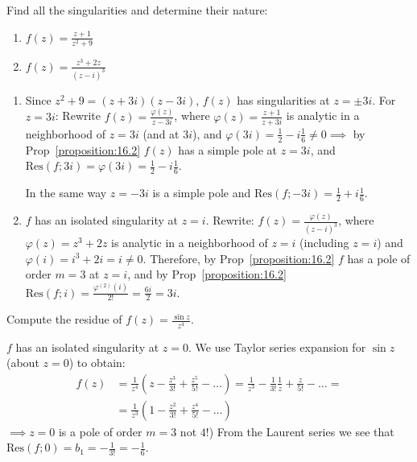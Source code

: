 \begin{example} \label{example:18.5} Find all the singularities and determine their nature:
    \begin{enumerate}
        \item $f(z) = \frac{z+1}{z^2 + 9}$
        \item $f(z) = \frac{z^3 + 2z}{(z-i)^3}$
    \end{enumerate}
\begin{soln}
    \begin{enumerate}
        \item Since $z^2 + 9 = (z+3i)(z-3i)$, $f(z)$ has singularities at $z = \pm 3i$. For $z = 3i$: Rewrite $f(z) = \frac{\varphi(z)}{z-3i}$, where $\varphi(z) = \frac{z+1}{z+3i}$ is analytic in a 
        neighborhood of $z = 3i$ (and at $3i$), 
        and $\varphi(3i) = \frac{1}{2} - i\frac{1}{6} \neq 0 \implies$ by Prop~\ref{proposition:16.2} $f(z)$ has a simple pole at $z = 3i$, and $\text{Res}(f; 3i) = \varphi(3i) = \frac{1}{2} - i\frac{1}{6}$.
    
    In the same way $z = -3i$ is a simple pole and $\text{Res}(f; -3i) = \frac{1}{2} + i\frac{1}{6}$.
    
    \item $f$ has an isolated singularity at $z = i$. Rewrite: $f(z) = \frac{\varphi(z)}{(z-i)^3}$, where $\varphi(z) = z^3 + 2z$ is analytic in a neighborhood of $z = i$ (including $z=i$) and $\varphi(i) = i^3 + 2i = i \neq 0$. 
    Therefore, by Prop~\ref{proposition:16.2} $f$ has a pole of order $m = 3$ at $z = i$, and by Prop~\ref{proposition:16.2} $\text{Res}(f; i) = \frac{\varphi^{(2)}(i)}{2!} = \frac{6i}{2} = 3i$.
    \end{enumerate}
\end{soln}
\end{example}

\begin{example} \label{example:18.6} Compute the residue of $f(z) = \frac{\sin z}{z^4}$.
    \begin{soln}
                $f$ has an isolated singularity at $z = 0$. We use Taylor series expansion for $\sin z$ (about $z = 0$) to obtain:
        \begin{align*} 
            f(z) & = \frac{1}{z^4} \left( z - \frac{z^3}{3!} + \frac{z^5}{5!} - \dots \right) = \frac{1}{z^3} - \frac{1}{3!} \frac{1}{z} + \frac{z}{5!} - \dots = \\
            & = \frac{1}{z^3}\left(1 - \frac{z^2}{3!} + \frac{z^4}{5!} - \dots \right) 
        \end{align*}
        $\implies z = 0$ is a pole of order $  m = 3$ not $4$!) 
        From the Laurent series we see that $\text{Res}(f; 0) = b_1 = -\frac{1}{3!} = -\frac{1}{6}$.
    \end{soln}
\end{example}

